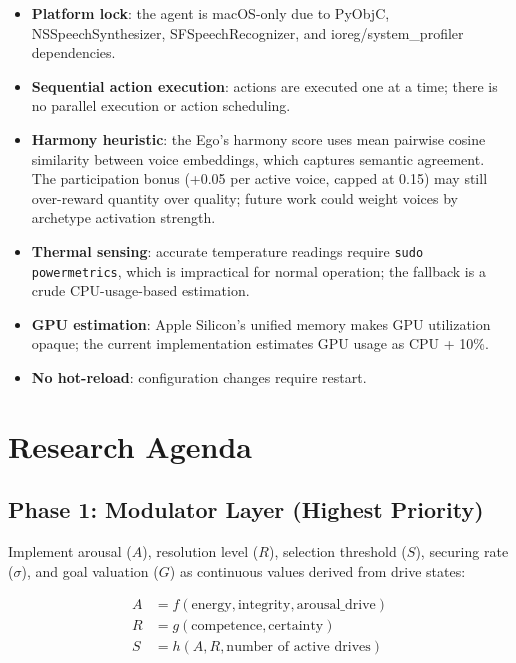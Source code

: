 \documentclass[11pt,oneside]{article}
\begin{document}
\begin{itemize}
  \item \textbf{Platform lock}: the agent is macOS-only due to PyObjC, NSSpeechSynthesizer, SFSpeechRecognizer, and ioreg/system\_profiler dependencies.
  \item \textbf{Sequential action execution}: actions are executed one at a time; there is no parallel execution or action scheduling.
  \item \textbf{Harmony heuristic}: the Ego's harmony score uses mean pairwise cosine similarity between voice embeddings, which captures semantic agreement.
        The participation bonus (+0.05 per active voice, capped at 0.15) may still over-reward quantity over quality; future work could weight voices by archetype activation strength.
  \item \textbf{Thermal sensing}: accurate temperature readings require \texttt{sudo powermetrics}, which is impractical for normal operation; the fallback is a crude CPU-usage-based estimation.
  \item \textbf{GPU estimation}: Apple Silicon's unified memory makes GPU utilization opaque; the current implementation estimates GPU usage as CPU + 10\%.
  \item \textbf{No hot-reload}: configuration changes require restart.
\end{itemize}


\section{Research Agenda}
\label{sec:roadmap}

\subsection{Phase 1: Modulator Layer (Highest Priority)}

Implement arousal ($A$), resolution level ($R$), selection threshold ($S$), securing rate ($\sigma$), and goal valuation ($G$) as continuous values derived from drive states:

\begin{align}
A &= f(\text{energy}, \text{integrity}, \text{arousal\_drive}) \\
R &= g(\text{competence}, \text{certainty}) \\
S &= h(A, R, \text{number of active drives})
\end{align}
\end{document}
